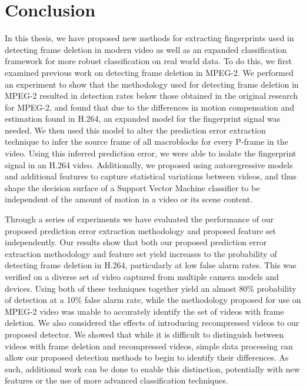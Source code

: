 \chapter{Conclusion}

In this thesis, we have proposed new methods for extracting fingerprints used in detecting frame deletion in modern video as well as an expanded classification framework for more robust classification on real world data. To do this, we first examined previous work on detecting frame deletion in MPEG-2.  We performed an experiment to show that the methodology used for detecting frame deletion in MPEG-2 resulted in detection rates below those obtained in the original research for MPEG-2, and found that due to the differences in motion compensation and estimation found in H.264, an expanded model for the fingerprint signal was needed. We then used this model to alter the prediction error extraction technique to infer the source frame of all macroblocks for every P-frame in the video. Using this inferred prediction error, we were able to isolate the fingerprint signal in an H.264 video. Additionally, we proposed using autoregressive models and additional features to capture statistical variations between videos, and thus shape the decision surface of a Support Vector Machine classifier to be independent of the amount of motion in a video or its scene content.

Through a series of experiments we have evaluated the performance of our proposed prediction error extraction methodology and proposed feature set independently. Our results show that both our proposed prediction error extraction methodology and feature set yield increases to the probability of detecting frame deletion in H.264, particularly at low false alarm rates. This was verified on a diverse set of video captured from multiple camera models and devices. Using both of these techniques together yield an almost 80\% probability of detection at a 10\% false alarm rate, while the methodology proposed for use on MPEG-2 video was unable to accurately identify the set of videos with frame deletion. We also considered the effects of introducing recompressed videos to our proposed detector. We showed that while it is difficult to distinguish between videos with frame deletion and recompressed videos, simple data processing can allow our proposed detection methods to begin to identify their differences. As such, additional work can be done to enable this distinction, potentially with new features or the use of more advanced classification techniques.